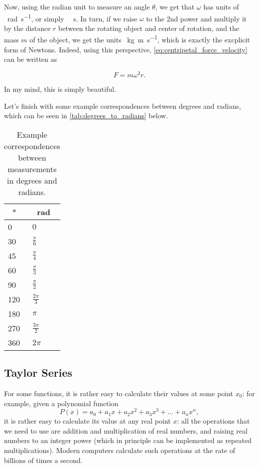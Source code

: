 Now, using the radian unit to measure an angle $\theta$, we get that $\omega$ has units of \SI{}{\radian\per\second}, or simply \SI{}{\per\second}. In turn, if we raise $\omega$ to the 2nd power and multiply it by the distance $r$ between the rotating object and center of rotation, and the mass $m$ of the object, we get the units \SI{}{\kilo\gram\meter\per\second}, which is exactly the excplicit form of Newtons. Indeed, using this perspective, \autoref{eq:centripetal_force_velocity} can be written as

\begin{equation}
	F = m\omega^{2}r.
	\label{eq:centripetal_force_angular_velocity}
\end{equation}

In my mind, this is simply beautiful.

Let's finish with some example correspondences between degrees and radians, which can be seen in \autoref{tab:degrees_to_radians} below.

\begin{table}
	\caption{Example correspondences between measurements in degrees and radians.}
	\label{tab:degrees_to_radians}
	\begin{center}
		{
			\renewcommand{\arraystretch}{1.2}
			\begin{tabular}[c]{l|l}
				\toprule
				\SI{}{\degree} & \SI{}{\radian}   \\
				\midrule
				0              & $0$              \\
				30             & $\frac{\pi}{6}$  \\
				45             & $\frac{\pi}{4}$  \\
				60             & $\frac{\pi}{3}$  \\
				90             & $\frac{\pi}{2}$  \\
				120            & $\frac{2\pi}{3}$ \\
				180            & $\pi$            \\
				270            & $\frac{3\pi}{2}$ \\
				360            & $2\pi$           \\
				\bottomrule
			\end{tabular}
		}
	\end{center}
\end{table}

\subsection{Taylor Series}
For some functions, it is rather easy to calculate their values at some point $x_{0}$: for example, given a polynomial function
\begin{equation}
	P(x) = a_{0} + a_{1}x + a_{2}x^{2} + a_{3}x^{3} + \dots + a_{n}x^{n},
	\label{eq:basic_polynomial}
\end{equation}
it is rather easy to calculate its value at any real point $x$: all the operations that we need to use are addition and multiplication of real numbers, and raising real numbers to an integer power (which in principle can be implemented as repeated multiplications). Modern computers calculate such operations at the rate of billions of times a second.

